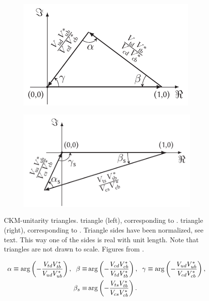 \begin{figure}[h]
  \centering
  \begin{subfigure}{0.475\textwidth}
    \raggedright
    \includegraphics[width=\textwidth]{Figures/Chapter1/b-d-triangle}
    \caption{}
    \label{unitTriangles_bd}
  \end{subfigure}%
  \hfill%
  \begin{subfigure}{0.525\textwidth}
    \raggedleft
    \includegraphics[width=\textwidth]{Figures/Chapter1/b-s-triangle}
    \caption{}
    \label{unitTriangles_bs}
  \end{subfigure}
  \caption{CKM-unitarity triangles. \Bd triangle (left), corresponding to . \Bs triangle (right),
           corresponding to . Triangle sides have been normalized, see text.
           This way one of the sides is real with unit length. Note that triangles are not drawn to scale. Figures from \cite{jeroenThesis}. }
  \label{unitTriangles}
\end{figure}

\begin{align}
  \centering
  \alpha \equiv \arg\left( -\frac{\Vtd\Vtb^*}{\Vud\Vub^*} \right),
  \;\;
  \beta  \equiv & \arg\left( -\frac{\Vcd\Vcb^*}{\Vtd\Vtb^*} \right),
  \;\;
  \gamma \equiv \arg\left( -\frac{\Vud\Vub^*}{\Vcd\Vcb^*} \right), \nonumber \\
  \betas \equiv & \arg\left( -\frac{\Vts\Vtb^*}{\Vcs\Vcb^*} \right).
  \label{ckm_angles_def}
\end{align}

